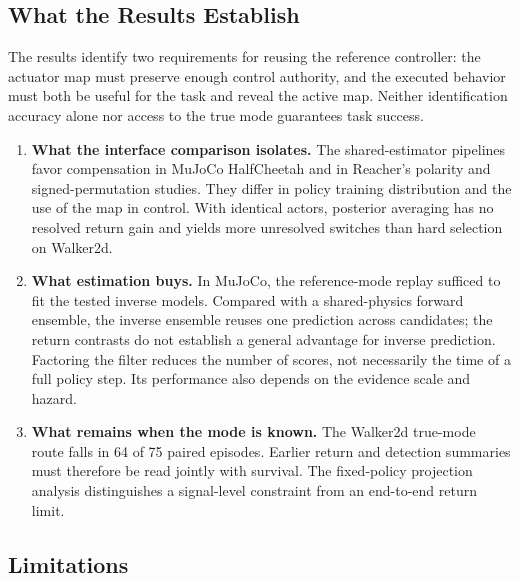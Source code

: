 \documentclass[twoside,11pt]{article}
\begin{document}
\subsection{What the Results Establish}

The results identify two requirements for reusing the reference controller: the actuator map must preserve enough control authority, and the executed behavior must both be useful for the task and reveal the active map. Neither identification accuracy alone nor access to the true mode guarantees task success.
\begin{enumerate}[leftmargin=*]
    \item \textbf{What the interface comparison isolates.} The shared-estimator pipelines favor compensation in MuJoCo HalfCheetah and in Reacher's polarity and signed-permutation studies. They differ in policy training distribution and the use of the map in control. With identical actors, posterior averaging has no resolved return gain and yields more unresolved switches than hard selection on Walker2d.
    \item \textbf{What estimation buys.} In MuJoCo, the reference-mode replay sufficed to fit the tested inverse models. Compared with a shared-physics forward ensemble, the inverse ensemble reuses one prediction across candidates; the return contrasts do not establish a general advantage for inverse prediction. Factoring the filter reduces the number of scores, not necessarily the time of a full policy step. Its performance also depends on the evidence scale and hazard.
    \item \textbf{What remains when the mode is known.} The Walker2d true-mode route falls in 64 of 75 paired episodes. Earlier return and detection summaries must therefore be read jointly with survival. The fixed-policy projection analysis distinguishes a signal-level constraint from an end-to-end return limit.
\end{enumerate}

\subsection{Limitations}
\label{sec:limitations}
\end{document}
